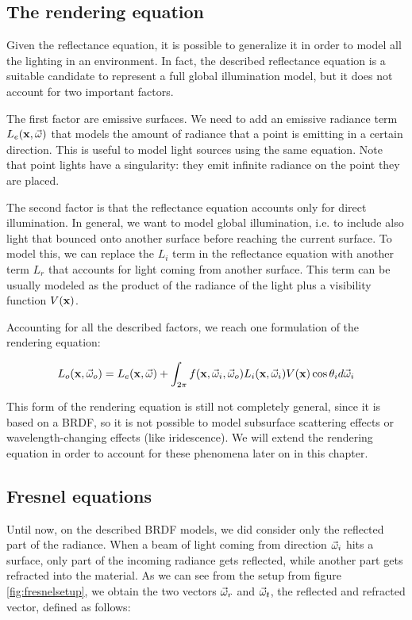 \subsection{The rendering equation}

Given the reflectance equation, it is possible to generalize it in order to model all the lighting in an environment. In fact, the described reflectance equation is a suitable candidate to represent a full global illumination model, but it does not account for two important factors. 

The first factor are emissive surfaces. We need to add an emissive radiance term $L_e(\mathbf{x}, \vec{\omega})$ that models the amount of radiance that a point is emitting in a certain direction. This is useful to model light sources using the same equation. Note that point lights have a singularity: they emit infinite radiance on the point they are placed.

The second factor is that the reflectance equation accounts only for direct illumination. In general, we want to model global illumination, i.e. to include also light that bounced onto another surface before reaching the current surface. To model this, we can replace the $L_i$ term in the reflectance equation with another term $L_r$ that accounts for light coming from another surface. This term can be usually modeled as the product of the radiance of the light plus a visibility function $V(\mathbf{x})$.

Accounting for all the described factors, we reach one formulation of the rendering equation:

$$
L_o(\mathbf{x}, \vec{\omega}_o) = L_e(\mathbf{x}, \vec{\omega}) + \int_{2\pi} f(\mathbf{x}, \vec{\omega}_i, \vec{\omega}_o) L_i(\mathbf{x}, \vec{\omega}_i) V(\mathbf{x}) \cos\theta_i d\vec{\omega}_i
$$

This form of the rendering equation is still not completely general, since it is based on a BRDF, so it is not possible to model subsurface scattering effects or wavelength-changing effects (like iridescence). We will extend the rendering equation in order to account for these phenomena later on in this chapter.

\subsection{Fresnel equations}
\label{sec:fresnel}


Until now, on the described BRDF models, we did consider only the reflected part of the radiance. When a beam of light coming from direction $\vec{\omega}_i$ hits a surface, only part of the incoming radiance gets reflected, while another part gets refracted into the material. As we can see from the setup from figure \ref{fig:fresnelsetup}, we obtain the two vectors $\vec{\omega}_r$ and $\vec{\omega}_t$, the reflected and refracted vector, defined as follows:

